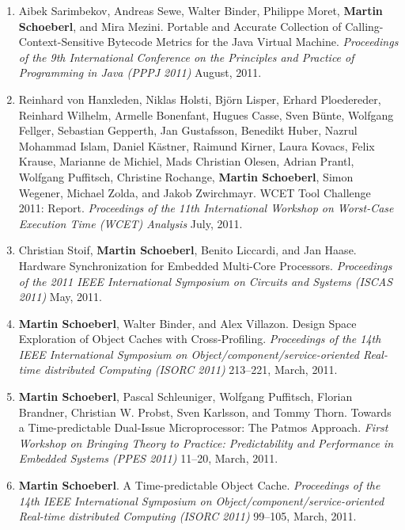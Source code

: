 \begin{enumerate}
\item Aibek Sarimbekov, Andreas Sewe, Walter Binder, Philippe Moret, {\bf Martin Schoeberl}, and Mira Mezini.
 Portable and Accurate Collection of Calling-Context-Sensitive Bytecode Metrics for the Java Virtual Machine.
 \emph{Proceedings of the 9th International Conference on the Principles and Practice of Programming in Java (PPPJ 2011)} August, 2011.

\item Reinhard von Hanxleden, Niklas Holsti, Bj{\"o}rn Lisper, Erhard Ploedereder, Reinhard Wilhelm, Armelle Bonenfant, Hugues Casse, Sven B{\"u}nte, Wolfgang Fellger, Sebastian Gepperth, Jan Gustafsson, Benedikt Huber, Nazrul Mohammad Islam, Daniel K{\"a}stner, Raimund Kirner, Laura Kovacs, Felix Krause, Marianne de Michiel, Mads Christian Olesen, Adrian Prantl, Wolfgang Puffitsch, Christine Rochange, {\bf Martin Schoeberl}, Simon Wegener, Michael Zolda, and Jakob Zwirchmayr.
 WCET Tool Challenge 2011: Report.
 \emph{Proceedings of the 11th International Workshop on Worst-Case Execution Time (WCET) Analysis} July, 2011.

\item Christian Stoif, {\bf Martin Schoeberl}, Benito Liccardi, and Jan Haase.
 Hardware Synchronization for Embedded Multi-Core Processors.
 \emph{Proceedings of the 2011 IEEE International Symposium on Circuits and Systems (ISCAS 2011)} May, 2011.

\item {\bf Martin Schoeberl}, Walter Binder, and Alex Villazon.
 Design Space Exploration of Object Caches with Cross-Profiling.
 \emph{Proceedings of the 14th IEEE International Symposium on Object/component/service-oriented Real-time distributed Computing (ISORC 2011)} 213--221, March, 2011.

\item {\bf Martin Schoeberl}, Pascal Schleuniger, Wolfgang Puffitsch, Florian Brandner, Christian W. Probst, Sven Karlsson, and Tommy Thorn.
 Towards a Time-predictable Dual-Issue Microprocessor: The Patmos Approach.
 \emph{First Workshop on Bringing Theory to Practice: Predictability and Performance in Embedded Systems (PPES 2011)} 11--20, March, 2011.

\item {\bf Martin Schoeberl}.
 A Time-predictable Object Cache.
 \emph{Proceedings of the 14th IEEE International Symposium on Object/component/service-oriented Real-time distributed Computing (ISORC 2011)} 99--105, March, 2011.



\end{enumerate}
